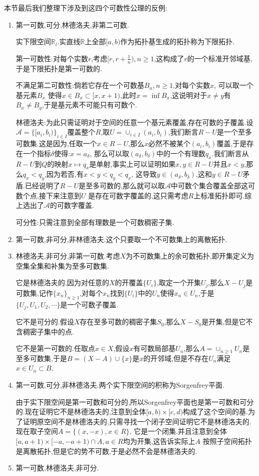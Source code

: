 本节最后我们整理下涉及到这四个可数性公理的反例:
\begin{enumerate}
	\item 第一可数,可分,林德洛夫,非第二可数.
	
	实下限空间$\mathbb{R}_l$.实直线$\mathbb{R}$上全部$[a,b)$作为拓扑基生成的拓扑称为下限拓扑.
	
	第一可数性:对每个实数$r$,考虑$[r,r+\frac{1} {n}),n\ge1$,这构成了$r$的一个标准开邻域基,于是下限拓扑是第一可数的.
	
	不满足第二可数性:倘若它存在一个可数基$B_n,n\ge1$,对每个实数$x$, 可以取一个基元素$B_x$ 使得$x\in B_x\subset[x,x+1)$,此时$x=\inf B_x$,这说明对于$x\not=y$有$B_x\not=B_y$,于是基元素不可能只有可数个.
	
	林德洛夫:为此只需证明对于空间的任意一个基元素覆盖,存在可数的子覆盖.设$\mathscr{A}=\{[a_i,b_i)\}_{i\in I}$覆盖整个$R$,取$U=\cup_{i\in I}(a_i,b_i)$,我们断言$R-U$是一个至多可数集.这是因为,任取一个$x\in R-U$,那么$x$必然不被某个$(a_i,b_i)$覆盖,于是存在一个指标$\delta$使得:$x=a_{\delta}$, 那么可以取$(a_{\delta},b_{\delta})$中的一个有理数$q_x$.我们断言从$R-U$到$Q$的映射$x\mapsto q_x$是单射,事实上可以证明如果$x,y\in R-U$并且$x<y$,那么$q_x<q_y$,因为若否,有$x<y<q_y<q_x$, 这导致$y\in (a_{\delta},b_{\delta})$,这和$y\in R-U$矛盾.已经说明了$R-U$是至多可数的,那么就可以取$\mathscr{A}$中可数个集合覆盖全部这可数个点,接下来注意到$U$ 是存在可数字覆盖的,这只需考虑$R$上标准拓扑即可.综上选出了$\mathscr{A}$的可数字覆盖.
	
	可分性:只需注意到全部有理数是一个可数稠密子集.
    \item 第一可数,非可分,非林德洛夫.这个只要取一个不可数集上的离散拓扑.
    \item 林德洛夫,非可分,非第一可数.考虑$X$为不可数集上的余可数拓扑,即开集定义为空集全集和补集为至多可数集.
    
    它是林德洛夫的,因为对任意的$X$的开覆盖$\{U_i\}$,取定一个开集$U_j$,那么$X-U_j$是可数集,记作$\{x_n\}_{n\ge1}$,对每个$x_n$找到$\{U_i\}$中的$U_n$使得$x_n\in U_n$,于是$\{U_j,U_1,U_2,\cdots\}$是一个可数子覆盖.
    
    它不是可分的.假设$X$存在至多可数的稠密子集$S_0$,那么$X-S_0$是开集,但是它不含稠密子集中的点.
    
    它不是第一可数的.任取点$x\in X$,假设$x$有可数局部基$U_n$,那么$A=\cup_{n\ge1}U_n$是至多可数集,于是$B=(X-A)\cup\{x\}$是$x$的开邻域,但是不存在$U_n$满足$x\in U_n\subset B$.
    \item 第一可数,可分,非林德洛夫.两个实下限空间的积称为Sorgenfrey平面.
    
    由于实下限空间是第一可数和可分的,所以Sorgenfrey平面也是第一可数和可分的.现在证明它不是林德洛夫的,注意到全体$[a,b)\times [c,d)$构成了这个空间的基.为了证明原空间不是林德洛夫的,只需寻找一个闭子空间证明它不是林德洛夫的.现在取子空间$A=\{(x,-x),x\in R\}$, 它是一个闭集.并且注意到全体$[a,a+1)\times[-a,-a+1)\cap A,a\in R$均为开集,这告诉实际上$A$ 按照子空间拓扑是离散拓扑,但是它的势不可数,于是必然不会是林德洛夫的.
    \item 第一可数,林德洛夫,非可分.
    

\end{enumerate}
